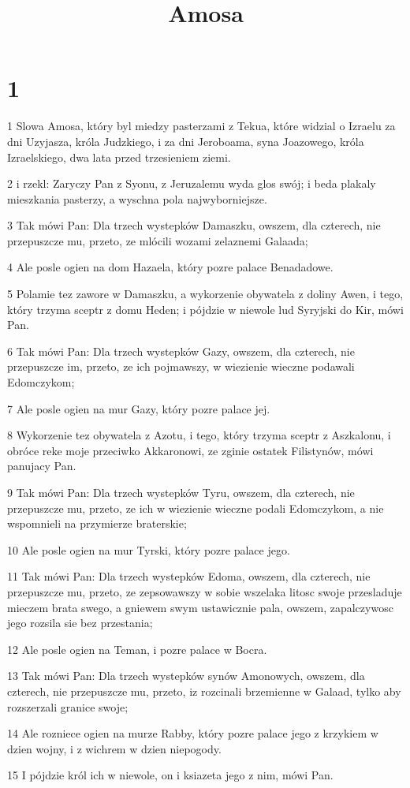 

\title{Amosa}


\chapter{1}

\par 1 Slowa Amosa, który byl miedzy pasterzami z Tekua, które widzial o Izraelu za dni Uzyjasza, króla Judzkiego, i za dni Jeroboama, syna Joazowego, króla Izraelskiego, dwa lata przed trzesieniem ziemi.
\par 2 i rzekl: Zaryczy Pan z Syonu, z Jeruzalemu wyda glos swój; i beda plakaly mieszkania pasterzy, a wyschna pola najwyborniejsze.
\par 3 Tak mówi Pan: Dla trzech wystepków Damaszku, owszem, dla czterech, nie przepuszcze mu, przeto, ze mlócili wozami zelaznemi Galaada;
\par 4 Ale posle ogien na dom Hazaela, który pozre palace Benadadowe.
\par 5 Polamie tez zawore w Damaszku, a wykorzenie obywatela z doliny Awen, i tego, który trzyma sceptr z domu Heden; i pójdzie w niewole lud Syryjski do Kir, mówi Pan.
\par 6 Tak mówi Pan: Dla trzech wystepków Gazy, owszem, dla czterech, nie przepuszcze im, przeto, ze ich pojmawszy, w wiezienie wieczne podawali Edomczykom;
\par 7 Ale posle ogien na mur Gazy, który pozre palace jej.
\par 8 Wykorzenie tez obywatela z Azotu, i tego, który trzyma sceptr z Aszkalonu, i obróce reke moje przeciwko Akkaronowi, ze zginie ostatek Filistynów, mówi panujacy Pan.
\par 9 Tak mówi Pan: Dla trzech wystepków Tyru, owszem, dla czterech, nie przepuszcze mu, przeto, ze ich w wiezienie wieczne podali Edomczykom, a nie wspomnieli na przymierze braterskie;
\par 10 Ale posle ogien na mur Tyrski, który pozre palace jego.
\par 11 Tak mówi Pan: Dla trzech wystepków Edoma, owszem, dla czterech, nie przepuszcze mu, przeto, ze zepsowawszy w sobie wszelaka litosc swoje przesladuje mieczem brata swego, a gniewem swym ustawicznie pala, owszem, zapalczywosc jego rozsila sie bez przestania;
\par 12 Ale posle ogien na Teman, i pozre palace w Bocra.
\par 13 Tak mówi Pan: Dla trzech wystepków synów Amonowych, owszem, dla czterech, nie przepuszcze mu, przeto, iz rozcinali brzemienne w Galaad, tylko aby rozszerzali granice swoje;
\par 14 Ale rozniece ogien na murze Rabby, który pozre palace jego z krzykiem w dzien wojny, i z wichrem w dzien niepogody.
\par 15 I pójdzie król ich w niewole, on i ksiazeta jego z nim, mówi Pan.

